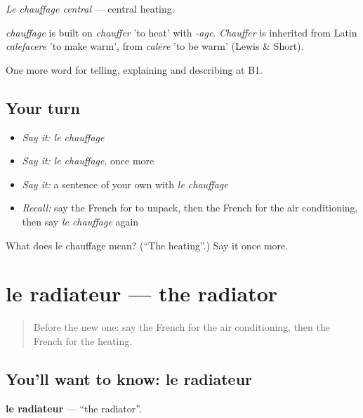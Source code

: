 \emph{Le chauffage central} — central heating.

\begin{cousinweb}
\emph{chauffage} is built on \emph{chauffer} 'to heat' with \emph{-age}. \emph{Chauffer} is inherited from Latin \emph{calefacere} 'to make warm', from \emph{calēre} 'to be warm' (Lewis \& Short).
\end{cousinweb}

\begin{grammarlens}[title={What you've built}]
One more word for telling, explaining and describing at B1.
\end{grammarlens}

\subsection*{Your turn}
\begin{itemize}
\raggedright
  \item \emph{Say it:} \emph{le chauffage}
  \item \emph{Say it:} \emph{le chauffage}, once more
  \item \emph{Say it:} a sentence of your own with \emph{le chauffage}
  \item \emph{Recall:} say the French for to unpack, then the French for the air conditioning, then say \emph{le chauffage} again
\end{itemize}

\begin{tcolorbox}[breakable,colback=teal!4,colframe=teal!35!black,title={Before you move on}]
What does le chauffage mean? (\textquotedblleft{}The heating\textquotedblright{}.) Say it once more.
\end{tcolorbox}
\section[le radiateur]{le radiateur — the radiator}

\label{lesson:FR-C427-radiateur}



\begin{quote}
Before the new one: say the French for the air conditioning, then the French for the heating.
\end{quote}

\subsection*{You'll want to know: le radiateur}
\textbf{le radiateur} — \textquotedblleft{}the radiator\textquotedblright{}.

